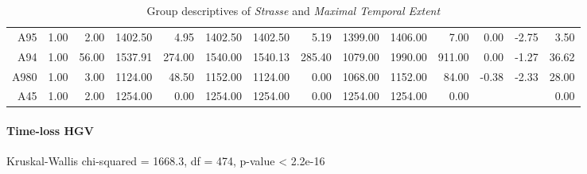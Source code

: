 \begin{table}[ht!]
\begin{tabular}{rrrrrrrrrrrrrr}
    A95  & 1.00 & 2.00 & 1402.50 & 4.95 & 1402.50 & 1402.50 & 5.19 & 1399.00 & 1406.00 & 7.00 & 0.00 & -2.75 & 3.50 \\ 
    A94  & 1.00 & 56.00 & 1537.91 & 274.00 & 1540.00 & 1540.13 & 285.40 & 1079.00 & 1990.00 & 911.00 & 0.00 & -1.27 & 36.62 \\ 
    A980 & 1.00 & 3.00 & 1124.00 & 48.50 & 1152.00 & 1124.00 & 0.00 & 1068.00 & 1152.00 & 84.00 & -0.38 & -2.33 & 28.00 \\ 
    A45  & 1.00 & 2.00 & 1254.00 & 0.00 & 1254.00 & 1254.00 & 0.00 & 1254.00 & 1254.00 & 0.00 &  &  & 0.00 \\ 
    \hline
  \end{tabular}
	\caption{Group descriptives of \textit{Strasse} and \textit{Maximal Temporal Extent}}
	\label{tbl:descriptives_baysis_matched_Strasse_TMax}
\end{table}

\paragraph{Time-loss HGV}
Kruskal-Wallis chi-squared = 1668.3, df = 474, p-value < 2.2e-16

